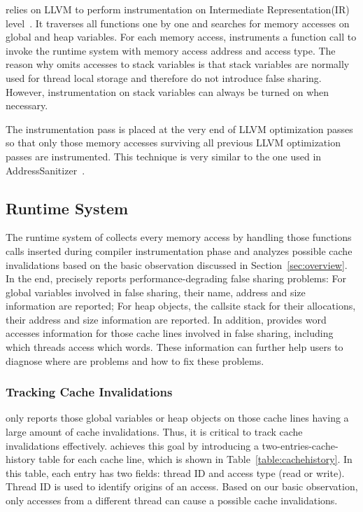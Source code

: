 \Predator{} relies on LLVM to perform instrumentation on Intermediate Representation(IR) level~\cite{llvm}.
It traverses all functions one by one and 
searches for memory accesses on global and heap variables. 
For each memory access, \Predator{} instruments a function call to 
invoke the runtime system with memory access address and access type.
The reason why \Predator{} omits accesses to stack variables 
is that stack variables are normally used for thread local storage and
therefore do not introduce false sharing. However, instrumentation on stack
variables can always be turned on when necessary. 

The instrumentation pass is placed at the very end of LLVM optimization passes 
so that only those memory accesses surviving all previous 
LLVM optimization passes are instrumented. 
This  technique is very similar to the one used in AddressSanitizer~\cite{Addresssanitizer}.

\subsection{Runtime System}
\label{sec:runtime}
The runtime system of \Predator{} collects every memory access by handling 
those functions calls inserted during compiler instrumentation phase and analyzes
possible cache invalidations based on the basic observation discussed in Section~\ref{sec:overview}.
In the end, \Predator{} precisely reports performance-degrading false sharing problems:
For global variables involved in false sharing, their name, address and size
information are reported; For heap objects, the callsite stack for their allocations, 
their address and size information are reported.
In addition, \Predator{} provides word accesses information for those cache lines 
involved in false sharing, including which threads access which words. 
These information can further help 
users to diagnose where are problems and how to fix these problems.

\subsubsection{Tracking Cache Invalidations}
\Predator{} only reports those global variables or heap objects on 
those cache lines having a large amount of cache invalidations. 
Thus, it is critical to track cache invalidations effectively. 
\Predator{} achieves this goal by introducing a  
two-entries-cache-history table for each cache line, which is 
shown in Table~\ref{table:cachehistory}. 
In this table, each entry has two fields: thread ID and access type (read or write).
Thread ID is used to identify origins of an access. Based on our basic observation,
only accesses from a different thread can cause a possible cache invalidations. 


